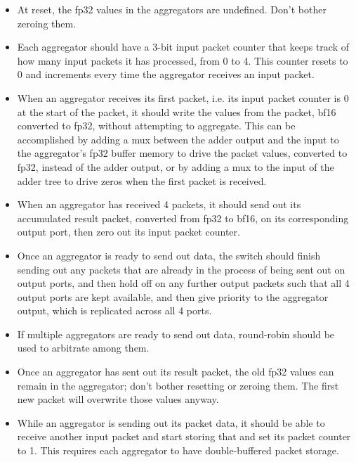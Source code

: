 \begin{tcolorbox}[
	colback=white,
	colframe=black,
	coltext=vrkblue,
	breakable,
	fontupper={\scriptsize\fontfamily{pcr}\selectfont},
	before upper={\RaggedRight}
	]
\begin{itemize}[leftmargin=*, topsep=2pt, itemsep=1pt]
		\item At reset, the fp32 values in the aggregators are undefined. Don't bother zeroing them.
		
		\item Each aggregator should have a 3-bit input packet counter that keeps track of how many input packets it has processed, from 0 to 4. This counter resets to 0 and increments every time the aggregator receives an input packet.
		
		\item When an aggregator receives its first packet, i.e. its input packet counter is 0 at the start of the packet, it should write the values from the packet, bf16 converted to fp32, without attempting to aggregate. This can be accomplished by adding a mux between the adder output and the input to the aggregator's fp32 buffer memory to drive the packet values, converted to fp32, instead of the adder output, or by adding a mux to the input of the adder tree to drive zeros when the first packet is received.
		
		\item When an aggregator has received 4 packets, it should send out its accumulated result packet, converted from fp32 to bf16, on its corresponding output port, then zero out its input packet counter.
		
		\item Once an aggregator is ready to send out data, the switch should finish sending out any packets that are already in the process of being sent out on output ports, and then hold off on any further output packets such that all 4 output ports are kept available, and then give priority to the aggregator output, which is replicated across all 4 ports.
		
		\item If multiple aggregators are ready to send out data, round-robin should be used to arbitrate among them.
		
		\item Once an aggregator has sent out its result packet, the old fp32 values can remain in the aggregator; don't bother resetting or zeroing them. The first new packet will overwrite those values anyway.
		
		\item While an aggregator is sending out its packet data, it should be able to receive another input packet and start storing that and set its packet counter to 1. This requires each aggregator to have double-buffered packet storage.
		

\end{itemize}
\end{tcolorbox}
